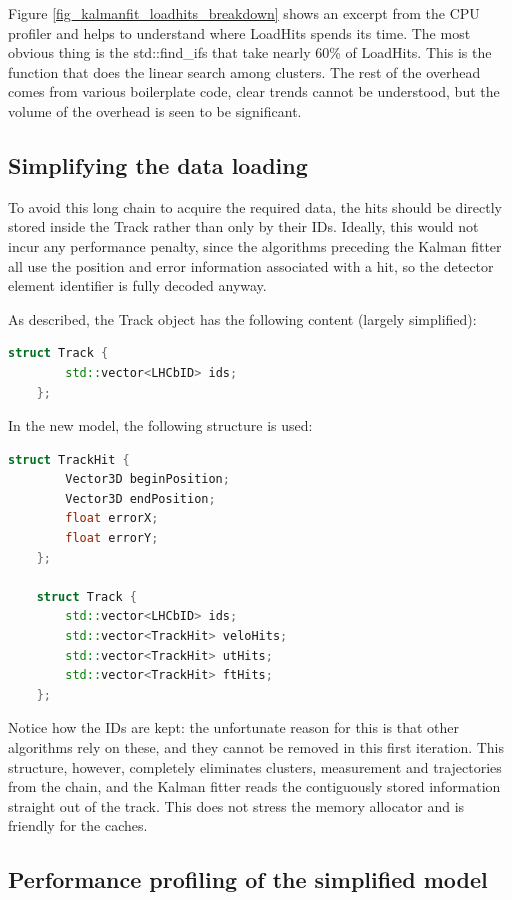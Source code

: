 \documentclass[12pt]{article}
\begin{document}
Figure \ref{fig_kalmanfit_loadhits_breakdown} shows an excerpt from the CPU profiler and helps to understand where LoadHits spends its time. The most obvious thing is the std::find\_ifs that take nearly 60\% of LoadHits. This is the function that does the linear search among clusters. The rest of the overhead comes from various boilerplate code, clear trends cannot be understood, but the volume of the overhead is seen to be significant.


\subsection{Simplifying the data loading}

To avoid this long chain to acquire the required data, the hits should be directly stored inside the Track rather than only by their IDs. Ideally, this would not incur any performance penalty, since the algorithms preceding the Kalman fitter all use the position and error information associated with a hit, so the detector element identifier is fully decoded anyway.

As described, the Track object has the following content (largely simplified):
\begin{lstlisting}[language=C++]
	struct Track {
		std::vector<LHCbID> ids;
	};
\end{lstlisting}

In the new model, the following structure is used:
\begin{lstlisting}[language=C++]
	struct TrackHit {
		Vector3D beginPosition;
		Vector3D endPosition;
		float errorX;
		float errorY;
	};
	
	struct Track {
		std::vector<LHCbID> ids;
		std::vector<TrackHit> veloHits;
		std::vector<TrackHit> utHits;
		std::vector<TrackHit> ftHits;
	};
\end{lstlisting}

Notice how the IDs are kept: the unfortunate reason for this is that other algorithms rely on these, and they cannot be removed in this first iteration. This structure, however, completely eliminates clusters, measurement and trajectories from the chain, and the Kalman fitter reads the contiguously stored information straight out of the track. This does not stress the memory allocator and is friendly for the caches.


\subsection{Performance profiling of the simplified model}
\end{document}
